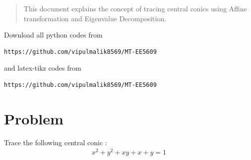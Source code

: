\documentclass[journal,12pt,twocolumn]{IEEEtran}
\begin{document}
\date{\today}

\maketitle
\newpage
\bigskip
\renewcommand{\thefigure}{\theenumi}
\renewcommand{\thetable}{\theenumi}

\begin{abstract}
This document explains the concept of tracing central conics using Affine transformation and Eigenvalue Decomposition.
\end{abstract}
Download all python codes from 
\begin{lstlisting}
https://github.com/vipulmalik8569/MT-EE5609
\end{lstlisting}
and latex-tikz codes from 
\begin{lstlisting}
https://github.com/vipulmalik8569/MT-EE5609
\end{lstlisting}
\section{\textbf{Problem}}
Trace the following central conic : 
\begin{align}
    x^2+y^2+xy+x+y=1\label{eq:0}
\end{align}
\end{document}
